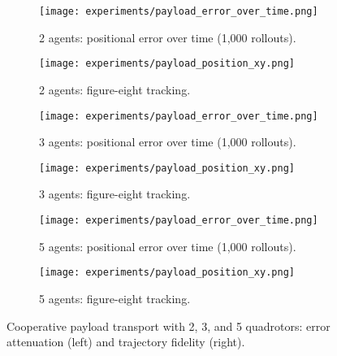 \begin{figure}[ht]
    \centering
    \begin{subfigure}[b]{0.49\textwidth}
        \texttt{[image: experiments/payload\_error\_over\_time.png]}
        \caption{2 agents: positional error over time (1,000 rollouts).}
        \label{fig:payload_error_2quads}
    \end{subfigure}
    \hfill
    \begin{subfigure}[b]{0.49\textwidth}
        \texttt{[image: experiments/payload\_position\_xy.png]}
        \caption{2 agents: figure-eight tracking.}
        \label{fig:payload_position_2quads}
    \end{subfigure}

    \vspace{1em}

    \begin{subfigure}[b]{0.49\textwidth}
        \texttt{[image: experiments/payload\_error\_over\_time.png]}
        \caption{3 agents: positional error over time (1,000 rollouts).}
        \label{fig:payload_error_3quads}
    \end{subfigure}
    \hfill
    \begin{subfigure}[b]{0.49\textwidth}
        \texttt{[image: experiments/payload\_position\_xy.png]}
        \caption{3 agents: figure-eight tracking.}
        \label{fig:payload_position_3quads}
    \end{subfigure}

    \vspace{1em}

    \begin{subfigure}[b]{0.49\textwidth}
        \texttt{[image: experiments/payload\_error\_over\_time.png]}
        \caption{5 agents: positional error over time (1,000 rollouts).}
        \label{fig:payload_error_5quads}
    \end{subfigure}
    \hfill
    \begin{subfigure}[b]{0.49\textwidth}
        \texttt{[image: experiments/payload\_position\_xy.png]}
        \caption{5 agents: figure-eight tracking.}
        \label{fig:payload_position_5quads}
    \end{subfigure}

    \caption{Cooperative payload transport with 2, 3, and 5 quadrotors: error attenuation (left) and trajectory fidelity (right).}
    \label{fig:multi_quad_payload}
\end{figure}

